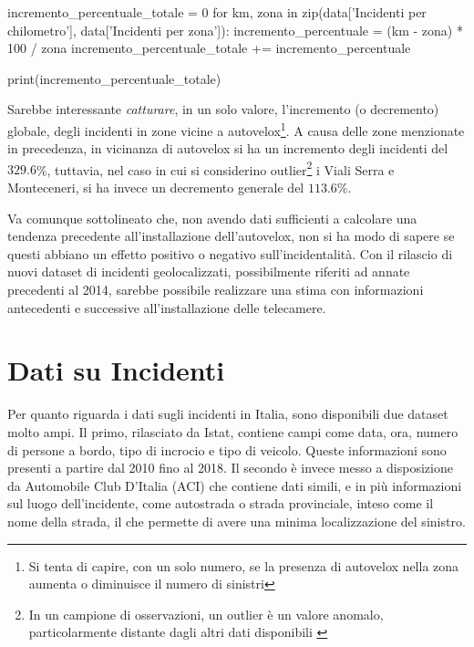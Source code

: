 \documentclass[a4paper,12pt]{report}
\newcommand{\quotestyle}[1]{\textit{#1}}
\begin{document}
\begin{code}
incremento_percentuale_totale = 0
for km, zona in zip(data['Incidenti per chilometro'], data['Incidenti per zona']): 
    incremento_percentuale = (km - zona) * 100 / zona
    incremento_percentuale_totale += incremento_percentuale

print(incremento_percentuale_totale)
\end{code}

Sarebbe interessante \quotestyle{catturare}, in un solo valore, l'incremento (o decremento) 
globale, degli incidenti in zone vicine a 
autovelox\footnote{Si tenta di capire, con un solo numero, se la presenza di autovelox nella zona 
aumenta o diminuisce il numero di sinistri}.
A causa delle zone menzionate in precedenza, in vicinanza di autovelox si ha un incremento degli 
incidenti del $329.6$\%, tuttavia, nel caso in cui si considerino 
outlier\footnote{In un campione di osservazioni, un outlier è un valore anomalo, 
particolarmente distante dagli altri dati disponibili \cite{PROB_E_STATISTICA:1}} 
i Viali Serra e Monteceneri, si ha invece un decremento generale del $113.6$\%.

Va comunque sottolineato che, non avendo dati sufficienti a calcolare una tendenza 
precedente all'installazione dell'autovelox, non si ha modo di sapere se questi abbiano un 
effetto positivo o negativo sull'incidentalità.
Con il rilascio di nuovi dataset di incidenti geolocalizzati, possibilmente riferiti ad annate 
precedenti al 2014, sarebbe possibile realizzare una stima con informazioni antecedenti e 
successive all'installazione delle telecamere.


\chapter{Dati su Incidenti}

Per quanto riguarda i dati sugli incidenti in Italia, sono disponibili due dataset 
molto ampi. 
Il primo, rilasciato da Istat, contiene campi come data, ora, 
numero di persone a bordo, tipo di incrocio e tipo di veicolo.
Queste informazioni sono presenti a partire dal 2010 fino al 2018.
Il secondo è invece messo a disposizione da Automobile Club D'Italia (ACI) che contiene dati simili, 
e in più informazioni sul luogo dell'incidente, come autostrada o strada provinciale, 
inteso come il nome della strada, il che permette di avere una minima localizzazione del 
sinistro.
\end{document}
